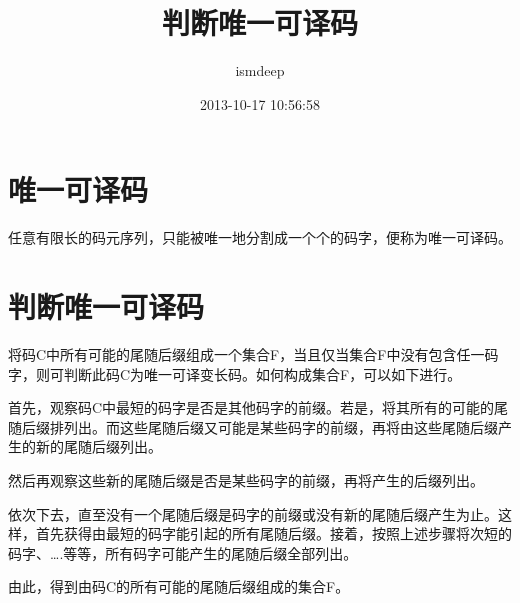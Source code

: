 \documentclass[12pt,a4paper]{article}
\begin{document}
\begin{CJK}{UTF8}{gbsn}
\title{判断唯一可译码}
\author{ismdeep}
\date{2013-10-17 10:56:58}


\maketitle


\newpage
\section{唯一可译码}
任意有限长的码元序列，只能被唯一地分割成一个个的码字，便称为唯一可译码。

\section{判断唯一可译码}
    将码C中所有可能的尾随后缀组成一个集合F，当且仅当集合F中没有包含任一码字，则可判断此码C为唯一可译变长码。如何构成集合F，可以如下进行。

首先，观察码C中最短的码字是否是其他码字的前缀。若是，将其所有的可能的尾随后缀排列出。而这些尾随后缀又可能是某些码字的前缀，再将由这些尾随后缀产生的新的尾随后缀列出。

然后再观察这些新的尾随后缀是否是某些码字的前缀，再将产生的后缀列出。

依次下去，直至没有一个尾随后缀是码字的前缀或没有新的尾随后缀产生为止。这样，首先获得由最短的码字能引起的所有尾随后缀。接着，按照上述步骤将次短的码字、….等等，所有码字可能产生的尾随后缀全部列出。

由此，得到由码C的所有可能的尾随后缀组成的集合F。

\end{CJK}
\end{document}
